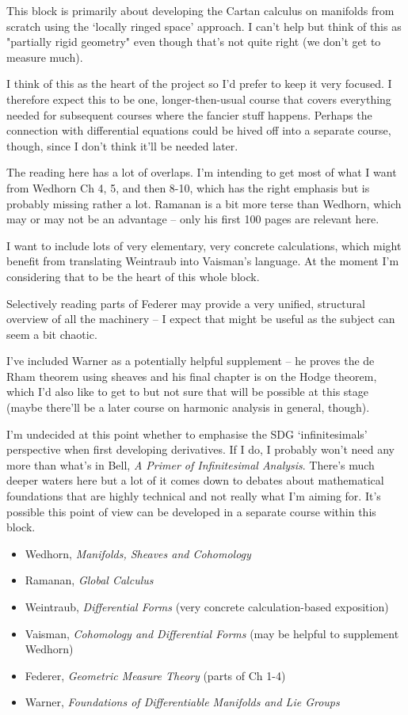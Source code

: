 \documentclass[article]{article}
\begin{document}
This block is primarily about developing the Cartan calculus on manifolds from scratch using the `locally ringed space' approach. I can't help but think of this as "partially rigid geometry" even though that's not quite right (we don't get to measure much). 

I think of this as the heart of the project so I'd prefer to keep it very focused. I therefore expect this to be one, longer-then-usual course that covers everything needed for subsequent courses where the fancier stuff happens. Perhaps the connection with differential equations could be hived off into a separate course, though, since I don't think it'll be needed later.

The reading here has a lot of overlaps. I'm intending to get most of what I want from Wedhorn Ch 4, 5, and then 8-10, which has the right emphasis but is probably missing rather a lot. Ramanan is a bit more terse than Wedhorn, which may or may not be an advantage -- only his first 100 pages are relevant here.

I want to include lots of very elementary, very concrete calculations, which might benefit from translating Weintraub into Vaisman's language. At the moment I'm considering that to be the heart of this whole block.

Selectively reading parts of Federer may provide a very unified, structural overview of all the machinery -- I expect that might be useful as the subject can seem a bit chaotic. 

I've included Warner as a potentially helpful supplement -- he proves the de Rham theorem using sheaves and his final chapter is on the Hodge theorem, which I'd also like to get to but not sure that will be possible at this stage (maybe there'll be a later course on harmonic analysis in general, though). 

I'm undecided at this point whether to emphasise the SDG `infinitesimals' perspective when first developing derivatives. If I do, I probably won't need any more than what's in Bell, \textit{A Primer of Infinitesimal Analysis}. There's much deeper waters here but a lot of it comes down to debates about mathematical foundations that are highly technical and not really what I'm aiming for. It's possible this point of view can be developed in a separate course within this block.

\begin{itemize}
	\item[]{Wedhorn, \textit{Manifolds, Sheaves and Cohomology}}
	\item[]{Ramanan, \textit{Global Calculus}}
	\item[]{Weintraub, \textit{Differential Forms} (very concrete calculation-based exposition)}
	\item[]{Vaisman, \textit{Cohomology and Differential Forms} (may be helpful to supplement Wedhorn)}
	\item[]{Federer, \textit{Geometric Measure Theory} (parts of Ch 1-4)}
	\item[]{Warner, \textit{Foundations of Differentiable Manifolds and Lie Groups}}
\end{itemize}
\end{document}
